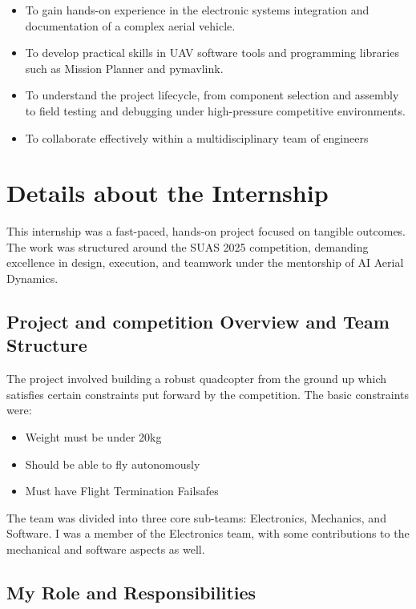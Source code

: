 \begin{itemize}
	\item To gain hands-on experience in the electronic systems integration and documentation of a complex aerial vehicle.
	\item To develop practical skills in UAV software tools and programming libraries such as Mission Planner and pymavlink.
	\item To understand the project lifecycle, from component selection and assembly to field testing and debugging under high-pressure competitive environments.
	\item To collaborate effectively within a multidisciplinary team of engineers
\end{itemize}

\section{Details about the Internship}

This internship was a fast-paced, hands-on project focused on tangible outcomes. The work was structured around the SUAS 2025 competition, demanding excellence in design, execution, and teamwork under the mentorship of AI Aerial Dynamics.

\subsection{Project and competition Overview and Team Structure}

The project involved building a robust quadcopter from the ground up which satisfies certain constraints put forward by the competition. The basic constraints were:
\begin{itemize}
	\item Weight must be under 20kg
	\item Should be able to fly autonomously
	\item Must have Flight Termination Failsafes
\end{itemize}

The team was divided into three core sub-teams: Electronics, Mechanics, and Software. I was a member of the Electronics team, with some contributions to the mechanical and software aspects as well.

\subsection{My Role and Responsibilities}

